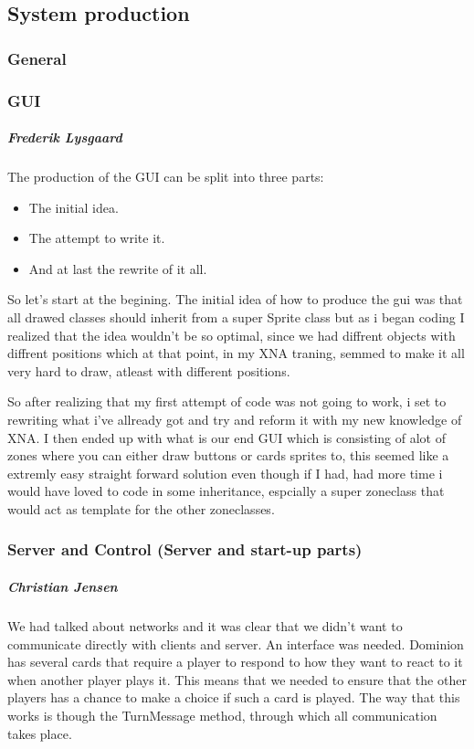 \subsection{System production}
\subsubsection{General}

\subsubsection{GUI}
\subparagraph{Frederik Lysgaard}
The production of the GUI can be split into three parts:
\begin{itemize}
\item The initial idea.
\item The attempt to write it.
\item  And at last the rewrite of it all.
\end{itemize}
 So let's start at the begining. The initial idea of how to produce the gui was that all drawed classes should inherit from a super Sprite class but as i began coding I realized that the idea wouldn't be so optimal, since we had diffrent objects with diffrent positions which at that point, in my XNA traning, semmed to make it all very hard to draw, atleast with different positions.

 So after realizing that my first attempt of code was not going to work, i set to rewriting what i've allready got and try and reform it with my new knowledge of XNA.
I then ended up with what is our end GUI which is consisting of alot of zones where you can either draw buttons or cards sprites to, this seemed like a extremly easy straight forward solution even though if I had, had more time i would have loved to code in some inheritance, espcially a super zoneclass that would act as template for the other zoneclasses.

\subsubsection{Server and Control (Server and start-up parts)}
\subparagraph{Christian Jensen}
We had talked about networks and it was clear that we didn't want to communicate directly with clients and server. An interface was needed.
Dominion has several cards that require a player to respond to how they want to react to it when another player plays it. 
This means that we needed to ensure that the other players has a chance to make a choice if such a card is played. 
The way that this works is though the TurnMessage method, through which all communication takes place. 

